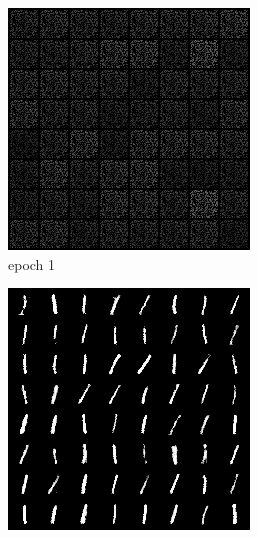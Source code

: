 \documentclass[a4paper]{article}
\theoremstyle{definition}
\newenvironment{soln}{
	\leavevmode\color{blue}\ignorespaces
}{}
\begin{document}
\begin{enumerate} [label=(\alph*)]
\begin{soln}
    		\begin{figure}[H]
    			\centering
    			\begin{subfigure}[b]{0.3\textwidth}
    				\centering
    				\includegraphics[width=\textwidth]{hw6/1.c/1_c_gen_img1.png}
    				\caption{epoch 1}
    			\end{subfigure}
    			\hfill
    			\begin{subfigure}[b]{0.3\textwidth}
    				\centering
    				\includegraphics[width=\textwidth]{hw6/1.c/1_c_gen_img100.png}

\end{subfigure}
\end{figure}
\end{soln}
\end{enumerate}
\end{document}

